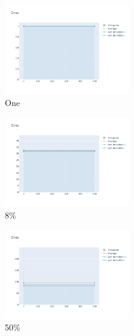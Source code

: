 \documentclass[12pt, fleqn]{report}                             %
\theoremstyle{break}                                            %
\begin{document}
      \begin{figure}[ht!]
        \centering
        \begin{subfigure}[b]{0.4\linewidth}
          \includegraphics[width=0.6\textwidth]{Images/132/dia-a.png}
          \caption{One}
        \end{subfigure}
        \begin{subfigure}[b]{0.4\linewidth}
          \includegraphics[width=0.6\textwidth]{Images/132/dia-b.png}
          \caption{8\%}
        \end{subfigure}
        \begin{subfigure}[b]{0.4\linewidth}
          \includegraphics[width=0.6\textwidth]{Images/132/dia-c.png}
          \caption{50\%}
        \end{subfigure}
        \begin{subfigure}[b]{0.4\linewidth}

\end{subfigure}
\end{figure}
\end{document}
